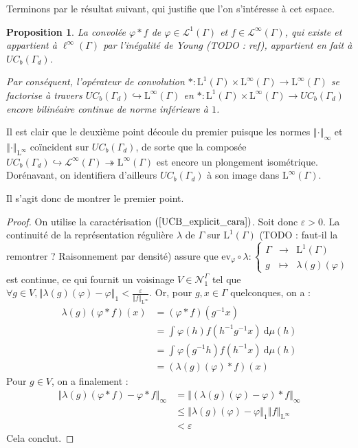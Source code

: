 \documentclass[a4paper,12pt]{article}
\newtheorem{proposition}[theorem]{Proposition}
\newcommand{\ev}{\mathrm{ev}}
\newcommand{\norm}[1]{\left\Vert #1\right\Vert}
\newcommand{\integral}[4]{\int_{#1}^{#2} #3~\mathrm{d}#4}
\newcommand\fundef[3]{#1: \left\{\begin{array}{ccc}#2\\#3\end{array}\right.}
\newcommand{\inv}{^{-1}}
\newcommand{\comp}{\circ}
\newcommand{\nhds}{\mathcal{N}}
\newcommand{\TODO}[1]{{\color{red}TODO :} #1}
\begin{document}
Terminons par le résultat suivant, qui justifie que l'on s'intéresse à cet espace.

\begin{proposition}\label{conv_UCB}
    La convolée $\varphi\ast f$ de $\varphi\in\mathscr{L}^1(\Gamma)$ et $f\in\mathscr{L}^\infty(\Gamma)$, qui existe et appartient à $\ell^\infty(\Gamma)$ par l'inégalité de Young (\TODO{ref}),
    appartient en fait à $UC_b(\Gamma_d)$.

    Par conséquent, l'opérateur de convolution $\ast:\mathrm{L}^1(\Gamma)\times\mathrm{L}^\infty(\Gamma)\to\mathrm{L}^\infty(\Gamma)$
    se factorise à travers $UC_b(\Gamma_d)\hookrightarrow\mathrm{L}^\infty(\Gamma)$ en 
    $\ast:\mathrm{L}^1(\Gamma)\times\mathrm{L}^\infty(\Gamma)\to UC_b(\Gamma_d)$ encore bilinéaire continue de norme inférieure à $1$.
\end{proposition}

Il est clair que le deuxième point découle du premier puisque les normes $\norm{\cdot}_\infty$ et $\norm{\cdot}_{\mathrm{L}^\infty}$ coïncident 
sur $UC_b(\Gamma_d)$, de sorte que la composée $UC_b(\Gamma_d)\hookrightarrow\mathscr{L}^\infty(\Gamma)\twoheadrightarrow\mathrm{L}^\infty(\Gamma)$
est encore un plongement isométrique. Dorénavant, on identifiera d'ailleurs $UC_b(\Gamma_d)$ à son image dans $\mathrm{L}^\infty(\Gamma)$.

Il s'agit donc de montrer le premier point.

\begin{proof}
    On utilise la caractérisation $(\ref{UCB_explicit_cara})$. Soit donc $\varepsilon>0$. La continuité de la représentation régulière $\lambda$ de $\Gamma$ sur $\mathrm{L}^1(\Gamma)$ (\TODO{faut-il la remontrer ? Raisonnement par densité}) assure que 
    $\fundef{\ev_\varphi\comp\lambda}{\Gamma&\to&\mathrm{L}^1(\Gamma)}{g&\mapsto&\lambda(g)(\varphi)}$ est continue, ce qui fournit 
    un voisinage $V\in\nhds_1^\Gamma$ tel que $\forall g\in V, \norm{\lambda(g)(\varphi) - \varphi}_1<\frac{\varepsilon}{\norm{f}_{\mathrm{L}^\infty}}$. Or, pour $g, x\in \Gamma$ quelconques, on a :
    \begin{align*}
        \lambda(g)(\varphi\ast f)(x)
            &= (\varphi\ast f)(g\inv x) \\
            &= \integral{}{}{\varphi(h)f(h\inv g\inv x)}{\mu(h)} \\
            &= \integral{}{}{\varphi(g\inv h)f(h\inv x)}{\mu(h)} \\
            &= (\lambda(g)(\varphi)\ast f)(x)
    \end{align*}
    Pour $g\in V$, on a finalement :
    \begin{align*}
        \norm{\lambda(g)(\varphi\ast f) - \varphi\ast f}_\infty 
            &= \norm{(\lambda(g)(\varphi) - \varphi)\ast f}_\infty \\
            &\le \norm{\lambda(g)(\varphi) - \varphi}_1\norm{f}_{\mathrm{L}^\infty} \\
            &< \varepsilon
    \end{align*}
    Cela conclut.
\end{proof}
\end{document}
